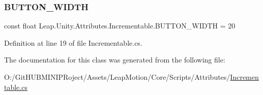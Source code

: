 \subsubsection{\texorpdfstring{BUTTON\_WIDTH}{BUTTON\_WIDTH}}
{\footnotesize\ttfamily const float Leap.\+Unity.\+Attributes.\+Incrementable.\+B\+U\+T\+T\+O\+N\+\_\+\+W\+I\+D\+TH = 20}



Definition at line 19 of file Incrementable.\+cs.



The documentation for this class was generated from the following file\+:\begin{DoxyCompactItemize}
\item 
O\+:/\+Git\+H\+U\+B\+M\+I\+N\+I\+P\+Roject/\+Assets/\+Leap\+Motion/\+Core/\+Scripts/\+Attributes/\mbox{\hyperlink{_incrementable_8cs}{Incrementable.\+cs}}\end{DoxyCompactItemize}
